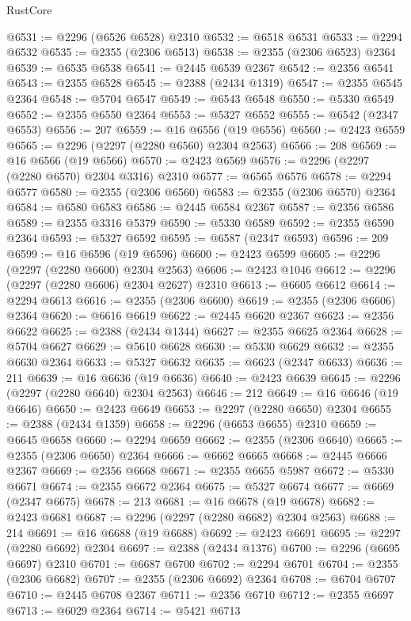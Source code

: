 \begin{lexlean}{RustCore}
\begin{coremodule}
@6531 := @2296 (@6526 @6528) @2310
@6532 := @6518 @6531
@6533 := @2294 @6532
@6535 := @2355 (@2306 @6513)
@6538 := @2355 (@2306 @6523) @2364
@6539 := @6535 @6538
@6541 := @2445 @6539 @2367
@6542 := @2356 @6541
@6543 := @2355 @6528
@6545 := @2388 (@2434 @1319)
@6547 := @2355 @6545 @2364
@6548 := @5704 @6547
@6549 := @6543 @6548
@6550 := @5330 @6549
@6552 := @2355 @6550 @2364
@6553 := @5327 @6552
@6555 := @6542 (@2347 @6553)
@6556 := 207
@6559 := @16 @6556 (@19 @6556)
@6560 := @2423 @6559
@6565 := @2296 (@2297 (@2280 @6560) @2304 @2563)
@6566 := 208
@6569 := @16 @6566 (@19 @6566)
@6570 := @2423 @6569
@6576 := @2296 (@2297 (@2280 @6570) @2304 @3316) @2310
@6577 := @6565 @6576
@6578 := @2294 @6577
@6580 := @2355 (@2306 @6560)
@6583 := @2355 (@2306 @6570) @2364
@6584 := @6580 @6583
@6586 := @2445 @6584 @2367
@6587 := @2356 @6586
@6589 := @2355 @3316 @5379
@6590 := @5330 @6589
@6592 := @2355 @6590 @2364
@6593 := @5327 @6592
@6595 := @6587 (@2347 @6593)
@6596 := 209
@6599 := @16 @6596 (@19 @6596)
@6600 := @2423 @6599
@6605 := @2296 (@2297 (@2280 @6600) @2304 @2563)
@6606 := @2423 @1046
@6612 := @2296 (@2297 (@2280 @6606) @2304 @2627) @2310
@6613 := @6605 @6612
@6614 := @2294 @6613
@6616 := @2355 (@2306 @6600)
@6619 := @2355 (@2306 @6606) @2364
@6620 := @6616 @6619
@6622 := @2445 @6620 @2367
@6623 := @2356 @6622
@6625 := @2388 (@2434 @1344)
@6627 := @2355 @6625 @2364
@6628 := @5704 @6627
@6629 := @5610 @6628
@6630 := @5330 @6629
@6632 := @2355 @6630 @2364
@6633 := @5327 @6632
@6635 := @6623 (@2347 @6633)
@6636 := 211
@6639 := @16 @6636 (@19 @6636)
@6640 := @2423 @6639
@6645 := @2296 (@2297 (@2280 @6640) @2304 @2563)
@6646 := 212
@6649 := @16 @6646 (@19 @6646)
@6650 := @2423 @6649
@6653 := @2297 (@2280 @6650) @2304
@6655 := @2388 (@2434 @1359)
@6658 := @2296 (@6653 @6655) @2310
@6659 := @6645 @6658
@6660 := @2294 @6659
@6662 := @2355 (@2306 @6640)
@6665 := @2355 (@2306 @6650) @2364
@6666 := @6662 @6665
@6668 := @2445 @6666 @2367
@6669 := @2356 @6668
@6671 := @2355 @6655 @5987
@6672 := @5330 @6671
@6674 := @2355 @6672 @2364
@6675 := @5327 @6674
@6677 := @6669 (@2347 @6675)
@6678 := 213
@6681 := @16 @6678 (@19 @6678)
@6682 := @2423 @6681
@6687 := @2296 (@2297 (@2280 @6682) @2304 @2563)
@6688 := 214
@6691 := @16 @6688 (@19 @6688)
@6692 := @2423 @6691
@6695 := @2297 (@2280 @6692) @2304
@6697 := @2388 (@2434 @1376)
@6700 := @2296 (@6695 @6697) @2310
@6701 := @6687 @6700
@6702 := @2294 @6701
@6704 := @2355 (@2306 @6682)
@6707 := @2355 (@2306 @6692) @2364
@6708 := @6704 @6707
@6710 := @2445 @6708 @2367
@6711 := @2356 @6710
@6712 := @2355 @6697
@6713 := @6029 @2364
@6714 := @5421 @6713

\end{coremodule}
\end{lexlean}
